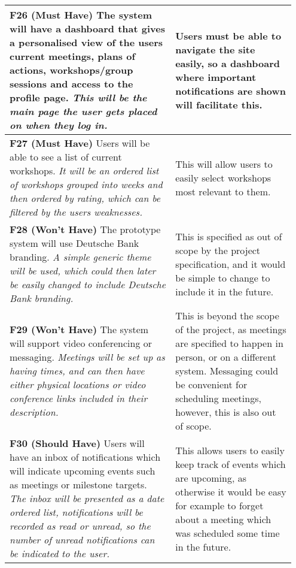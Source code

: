 \documentclass[10pt]{article}
\begin{document}
\begin{longtable}{|p{0.55\linewidth}|p{0.4\linewidth}|}
    \textbf{F26 (Must Have) }
    The system will have a dashboard that gives a personalised view of the users
    current meetings, plans of actions, workshops/group sessions and access to
    the profile page.
    \textit{This will be the main page the user gets placed on when they log in.}
        &
    Users must be able to navigate the site easily, so a dashboard where
    important notifications are shown will facilitate this.
    \\ \hline

    \textbf{F27 (Must Have) }
    Users will be able to see a list of current workshops.
    \textit{It will be an ordered list of workshops grouped into weeks and then
    ordered by rating, which can be filtered by the users weaknesses.}
    &
    This will allow users to easily select workshops most relevant to them.
    \\ \hline

    \textbf{F28 (Won't Have) }
    The prototype system will use Deutsche Bank branding.
    \textit{A simple generic theme will be used, which could then later be
    easily changed to include Deutsche Bank branding.}
    &
    This is specified as out of scope by the project specification, and it would
    be simple to change to include it in the future.
    \\ \hline

    \textbf{F29 (Won't Have) }
    The system will support video conferencing or messaging.
    \textit{Meetings will be set up as having times, and can then have either
    physical locations or video conference links included in their description.}
    &
    This is beyond the scope of the project, as meetings are specified to happen
    in person, or on a different system. Messaging could be convenient for
    scheduling meetings, however, this is also out of scope.
    \\ \hline

    \textbf{F30 (Should Have) }
    Users will have an inbox of notifications which will indicate upcoming
    events such as meetings or milestone targets.
    \textit{The inbox will be presented as a date ordered list, notifications
    will be recorded as read or unread, so the number of unread notifications
    can be indicated to the user.}
    &
    This allows users to easily keep track of events which are upcoming, as
    otherwise it would be easy for example to forget about a meeting which
    was scheduled some time in the future.
    \\ \hline

\end{longtable}
\end{document}
